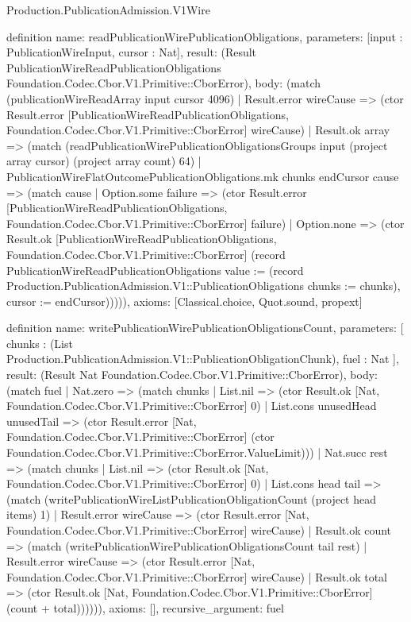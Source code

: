 \begin{lexlean}{Production.PublicationAdmission.V1Wire}
\begin{semanticmodule}
definition{
  name: readPublicationWirePublicationObligations,
  parameters: [input : PublicationWireInput, cursor : Nat],
  result: (Result PublicationWireReadPublicationObligations Foundation.Codec.Cbor.V1.Primitive::CborError),
  body: (match (publicationWireReadArray input cursor 4096)
    | Result.error wireCause => (ctor Result.error [PublicationWireReadPublicationObligations, Foundation.Codec.Cbor.V1.Primitive::CborError] wireCause)
    | Result.ok array => (match (readPublicationWirePublicationObligationsGroups input (project array cursor) (project array count) 64)
      | PublicationWireFlatOutcomePublicationObligations.mk chunks endCursor cause => (match cause
        | Option.some failure => (ctor Result.error [PublicationWireReadPublicationObligations, Foundation.Codec.Cbor.V1.Primitive::CborError] failure)
        | Option.none => (ctor Result.ok [PublicationWireReadPublicationObligations, Foundation.Codec.Cbor.V1.Primitive::CborError] (record PublicationWireReadPublicationObligations {value := (record Production.PublicationAdmission.V1::PublicationObligations {chunks := chunks}), cursor := endCursor}))))),
  axioms: [Classical.choice, Quot.sound, propext]
}

definition{
  name: writePublicationWirePublicationObligationsCount,
  parameters: [
    chunks : (List Production.PublicationAdmission.V1::PublicationObligationChunk),
    fuel : Nat
  ],
  result: (Result Nat Foundation.Codec.Cbor.V1.Primitive::CborError),
  body: (match fuel
    | Nat.zero => (match chunks
      | List.nil => (ctor Result.ok [Nat, Foundation.Codec.Cbor.V1.Primitive::CborError] 0)
      | List.cons unusedHead unusedTail => (ctor Result.error [Nat, Foundation.Codec.Cbor.V1.Primitive::CborError] (ctor Foundation.Codec.Cbor.V1.Primitive::CborError.ValueLimit)))
    | Nat.succ rest => (match chunks
      | List.nil => (ctor Result.ok [Nat, Foundation.Codec.Cbor.V1.Primitive::CborError] 0)
      | List.cons head tail => (match (writePublicationWireListPublicationObligationCount (project head items) 1)
        | Result.error wireCause => (ctor Result.error [Nat, Foundation.Codec.Cbor.V1.Primitive::CborError] wireCause)
        | Result.ok count => (match (writePublicationWirePublicationObligationsCount tail rest)
          | Result.error wireCause => (ctor Result.error [Nat, Foundation.Codec.Cbor.V1.Primitive::CborError] wireCause)
          | Result.ok total => (ctor Result.ok [Nat, Foundation.Codec.Cbor.V1.Primitive::CborError] (count + total)))))),
  axioms: [],
  recursive_argument: fuel
}


\end{semanticmodule}
\end{lexlean}
